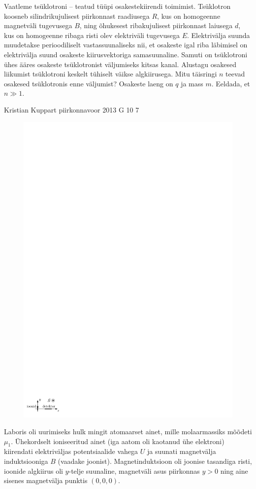 \documentclass[11pt]{article}
\begin{document}
{{Vaatleme tsüklotroni -- teatud tüüpi osakestekiirendi toimimist. Tsüklotron koosneb silindrikujulisest piirkonnast raadiusega $R$, kus on homogeenne magnetväli tugevusega $B$, ning õhukesest ribakujulisest piirkonnast laiusega $d$, kus on homogeenne ribaga risti olev elektriväli tugevusega $E$. Elektrivälja suunda muudetakse perioodiliselt vastassuunaliseks nii, et osakeste igal riba läbimisel on elektrivälja suund osakeste kiirusvektoriga samasuunaline. Samuti on tsüklotroni ühes ääres osakeste tsüklotronist väljumiseks kitsas kanal. Alustagu osakesed liikumist tsüklotroni keskelt tühiselt väikse algkiirusega. Mitu täisringi $n$ teevad osakesed tsüklotronis enne väljumist? Osakeste laeng on $q$ ja mass $m$. Eeldada, et $n\gg 1.$
\fi
}

{Kristian Kuppart} %
{piirkonnavoor} %
{2013} %
{G 10} %
{7} %
{
\ifStatement
\begin{figure}%
\includegraphics[width=\linewidth]{2013-v2g-10-massspektromeeter_ipe}%
\end{figure}
Laboris oli uurimiseks hulk mingit atomaarset ainet, mille molaarmassiks mõõdeti
$\mu_{1}$. Ühekordselt ioniseeritud ainet (iga aatom oli kaotanud ühe
elektroni) kiirendati elektriväljas potentsiaalide vahega $U$ ja suunati magnetvälja
induktsiooniga $B$ (vaadake joonist). Magnetinduktsioon oli joonise tasandiga
risti, 
ioonide algkiirus oli $y$-telje suunaline,
magnetväli asus piirkonnas $y>0$ ning aine sisenes magnetvälja punktis
$(0, 0, 0)$.

}}
\end{document}
